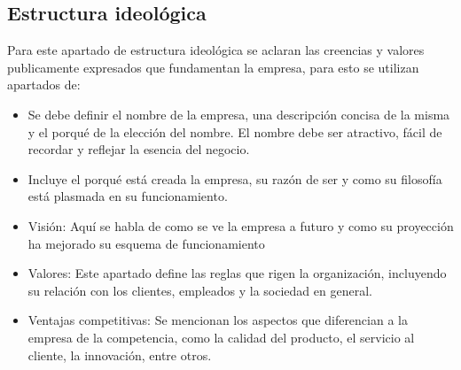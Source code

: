
\subsection{Estructura ideológica}

Para este apartado de estructura ideológica se aclaran las creencias y valores publicamente expresados que fundamentan la empresa, para esto se utilizan apartados de:

\begin{itemize}
    \item Se debe definir el nombre de la empresa, una descripción concisa de la misma y el porqué de la elección del nombre. El nombre debe ser atractivo, fácil de recordar y reflejar la esencia del negocio. 
    
    \item Incluye el porqué está creada la empresa, su razón de ser y como su filosofía está plasmada en su funcionamiento.
    \item Visión: Aquí se habla de como se ve la empresa a futuro y como su proyección ha mejorado su esquema de funcionamiento
    \item Valores: Este apartado define las reglas que rigen la organización, incluyendo su relación con los clientes, empleados y la sociedad en general.
    \item Ventajas competitivas: Se mencionan los aspectos que diferencian a la empresa de la competencia, como la calidad del producto, el servicio al cliente, la innovación, entre otros.
    
\end{itemize}

